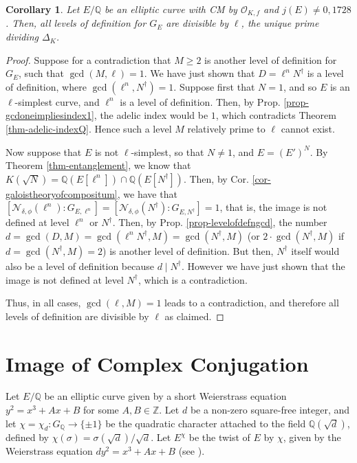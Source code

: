 \documentclass[11pt]{amsart}
\newtheorem{corollary}[defn]{Corollary}
\theoremstyle{definition}
\newcommand{\Q}{\mathbb{Q}}
\newcommand{\Z}{\mathbb{Z}}
\newcommand{\Of}{\mathcal{O}_{K,f}}
\begin{document}
\begin{corollary}\label{cor-indexisalways2}
    Let $E/\Q$ be an elliptic curve with CM by $\Of$ and $j(E) \neq 0, 1728$. Then, all levels of definition for $G_E$ are divisible by $\ell$, the unique prime dividing $\Delta_K$.
\end{corollary}
\begin{proof}

   Suppose for a contradiction that $M\geq 2$ is another level of definition for $G_E$, such that $\gcd(M,\ell)=1$. We have just shown that $D=\ell^n N^\dagger$ is a level of definition, where $\gcd(\ell^n,N^\dagger)=1$. Suppose first that $N=1$, and so $E$ is an $\ell$-simplest curve, and $\ell^n$ is a level of definition. Then, by Prop. \ref{prop-gcdoneimpliesindex1}, the adelic index would be $1$, which contradicts Theorem \ref{thm-adelic-indexQ}. Hence such a level $M$ relatively prime to $\ell$ cannot exist.    
    
    Now suppose that $E$ is not $\ell$-simplest, so that $N\neq 1$, and $E=(E')^N$. By Theorem \ref{thm-entanglement}, we know that $K(\sqrt{N}) = \Q(E[\ell^n]) \cap \Q(E[N^\dagger])$. Then, by Cor. \ref{cor-galoistheoryofcompositum}, we have that $[\mathcal{N}_{\delta, \phi}(\ell^n) : G_{E, \ell^n}]=[\mathcal{N}_{\delta, \phi}(N^\dagger) : G_{E, N^\dagger}] = 1$, that is, the image is not defined at level $\ell^n$ or $N^\dagger$. Then, by Prop. \ref{prop-levelofdefngcd}, the number $d=\gcd(D,M)=\gcd(\ell^n N^\dagger,M)=\gcd(N^\dagger,M)$ (or $2\cdot \gcd(N^\dagger,M)$ if $d=\gcd(N^\dagger,M)=2$) is another level of definition. But then, $N^\dagger$ itself would also be a level of definition because $d\mid  N^\dagger$. However we have just shown that the image is not defined at level $N^\dagger$, which is a contradiction.

    Thus, in all cases, $\gcd(\ell,M)=1$ leads to a contradiction, and therefore all levels of definition are divisible by $\ell$ as claimed.
\end{proof}

\section{Image of Complex Conjugation}\label{sec-complexconj}

Let $E/\Q$ be an elliptic curve given by a short Weierstrass equation $y^2=x^3+Ax+B$ for some $A,B\in\Z$. Let $d$ be a non-zero square-free integer, and let $\chi=\chi_d\colon G_\Q \to \{\pm 1\}$ be the quadratic character attached to the field $\Q(\sqrt{d})$, defined by $\chi(\sigma)=\sigma(\sqrt{d})/\sqrt{d}$. Let $E^\chi$ be the twist of $E$ by $\chi$, given by the Weierstrass equation $dy^2=x^3+Ax+B$ (see \cite[Ch. X, Example 2.4]{silverman1}). 
\end{document}
